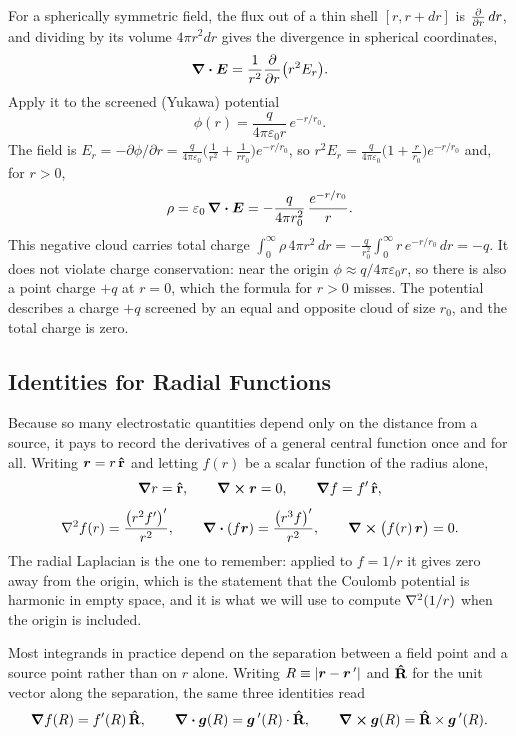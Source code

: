 For a spherically symmetric field, the flux out of a thin shell $[r,r+dr]$ is $\pdv{}{r}(4\pi r^2E_r)\,dr$, and dividing by its volume $4\pi r^2dr$ gives the divergence in spherical coordinates,
\[
  \div\vect{E} = \frac{1}{r^2}\pdv{}{r}\bigl(r^2 E_r\bigr).
\]
Apply it to the screened (Yukawa) potential
\[
  \phi(r) = \frac{q}{4\pi\varepsilon_0 r}\,e^{-r/r_0}.
\]
The field is $E_r = -\partial\phi/\partial r = \frac{q}{4\pi\varepsilon_0}\bigl(\frac{1}{r^2}+\frac{1}{r r_0}\bigr)e^{-r/r_0}$, so $r^2E_r = \frac{q}{4\pi\varepsilon_0}\bigl(1+\frac{r}{r_0}\bigr)e^{-r/r_0}$ and, for $r>0$,
\[
  \rho = \varepsilon_0\,\div\vect{E} = -\frac{q}{4\pi r_0^2}\,\frac{e^{-r/r_0}}{r}.
\]
This negative cloud carries total charge $\int_0^\infty\rho\,4\pi r^2\,dr = -\frac{q}{r_0^2}\int_0^\infty r\,e^{-r/r_0}\,dr = -q$. It does not violate charge conservation: near the origin $\phi\approx q/4\pi\varepsilon_0 r$, so there is also a point charge $+q$ at $r=0$, which the formula for $r>0$ misses. The potential describes a charge $+q$ screened by an equal and opposite cloud of size $r_0$, and the total charge is zero.

\subsection{Identities for Radial Functions}

Because so many electrostatic quantities depend only on the distance from a source, it pays to record the derivatives of a general central function once and for all. Writing $\bm{r} = r\,\boldsymbol{\hat{\textbf{r}}}$ and letting $f(r)$ be a scalar function of the radius alone,
\[
    \grad r = \boldsymbol{\hat{\textbf{r}}}, \qquad \curl\bm{r} = 0, \qquad \grad f = f'\,\boldsymbol{\hat{\textbf{r}}},
\]
\[
    \laplacian{f(r)} = \frac{\left(r^2 f'\right)'}{r^2}, \qquad
    \div(f\lvect{r}) = \frac{\left(r^3 f\right)'}{r^2}, \qquad
    \curl\bigl(f(r)\,\lvect{r}\bigr) = 0.
\]
The radial Laplacian is the one to remember: applied to $f = 1/r$ it gives zero away from the origin, which is the statement that the Coulomb potential is harmonic in empty space, and it is what we will use to compute $\laplacian(1/r)$ when the origin is included.

Most integrands in practice depend on the separation between a field point and a source point rather than on $r$ alone. Writing $R \equiv |\bm{r}-\bm{r}\,'|$ and $\boldsymbol{\hat{\textbf{R}}}$ for the unit vector along the separation, the same three identities read
\[
    \grad f(R) = f'(R)\,\boldsymbol{\hat{\textbf{R}}}, \qquad
    \div\bm{g}(R) = \bm{g}\,'(R)\cdot\boldsymbol{\hat{\textbf{R}}}, \qquad
    \curl\bm{g}(R) = \boldsymbol{\hat{\textbf{R}}}\times\bm{g}\,'(R).
\]


